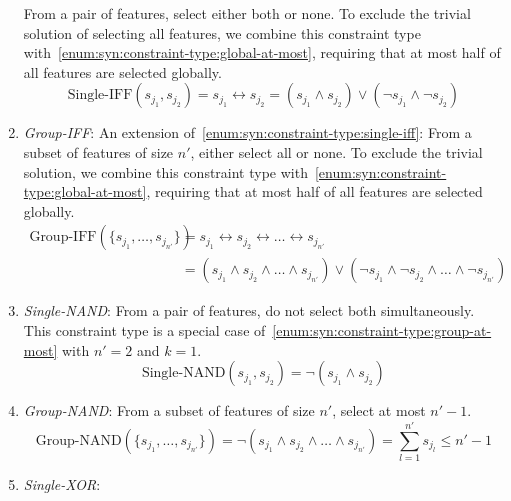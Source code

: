 \begin{enumerate}[label=(T\arabic*), wide, noitemsep]
	From a pair of features, select either both or none.
	To exclude the trivial solution of selecting all features, we combine this constraint type with~\ref{enum:syn:constraint-type:global-at-most}, requiring that at most half of all features are selected globally.
	\begin{equation}
		\text{Single-IFF}(s_{j_1}, s_{j_2}) = s_{j_1} \leftrightarrow s_{j_2} = (s_{j_1} \land s_{j_2}) \lor (\lnot s_{j_1} \land \lnot s_{j_2})
		\label{eq:syn:constraint:single-iff}
	\end{equation}
	\item\label{enum:syn:constraint-type:group-iff} \emph{Group-IFF}:
	An extension of~\ref{enum:syn:constraint-type:single-iff}:
	From a subset of features of size $n'$, either select all or none.
	To exclude the trivial solution, we combine this constraint type with~\ref{enum:syn:constraint-type:global-at-most}, requiring that at most half of all features are selected globally.
	\begin{equation}
		\begin{aligned}
			\text{Group-IFF}(\{s_{j_1}, \dots, s_{j_{n'}}\}) &= s_{j_1} \leftrightarrow s_{j_2} \leftrightarrow \dots \leftrightarrow s_{j_{n'}} \\
			&= (s_{j_1} \land s_{j_2} \land \dots \land s_{j_{n'}}) \lor (\lnot s_{j_1} \land \lnot s_{j_2} \land \dots \land \lnot s_{j_{n'}})
		\end{aligned}
		\label{eq:syn:constraint:group-iff}
	\end{equation}
	\item\label{enum:syn:constraint-type:single-nand} \emph{Single-NAND}:
	From a pair of features, do not select both simultaneously.
	This constraint type is a special case of~\ref{enum:syn:constraint-type:group-at-most} with $n'=2$ and $k=1$.
	\begin{equation}
		\text{Single-NAND}(s_{j_1}, s_{j_2}) = \lnot (s_{j_1} \land s_{j_2})
		\label{eq:syn:constraint:single-nand}
	\end{equation}
	\item\label{enum:syn:constraint-type:group-nand} \emph{Group-NAND}:
	From a subset of features of size $n'$, select at most $n'-1$.
	\begin{equation}
		\text{Group-NAND}(\{s_{j_1}, \dots, s_{j_{n'}}\}) =	\lnot (s_{j_1} \land s_{j_2} \land \dots \land s_{j_{n'}}) = \sum_{l=1}^{n'} s_{j_l} \leq n'-1
		\label{eq:syn:constraint:group-nand}
	\end{equation}
	\item\label{enum:syn:constraint-type:single-xor} \emph{Single-XOR}:

\end{enumerate}
